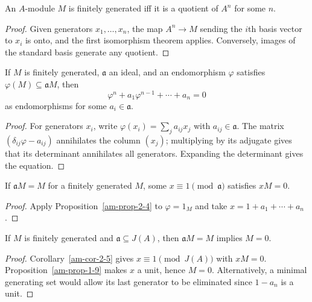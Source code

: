 \begin{proposition}
\label{am-prop-2-3}
\uses{}
An $A$-module $M$ is finitely generated iff it is a quotient of $A^n$ for some
$n$.
\end{proposition}
\begin{proof}
Given generators $x_1,\ldots,x_n$, the map $A^n\to M$ sending the $i$th basis
vector to $x_i$ is onto, and the first isomorphism theorem applies.  Conversely,
images of the standard basis generate any quotient.
\end{proof}
\begin{proposition}
\label{am-prop-2-4}
\uses{}
If $M$ is finitely generated, $\mathfrak{a}$ an ideal, and an endomorphism
$\varphi$ satisfies $\varphi(M)\subseteq\mathfrak{a}M$, then
\[\varphi^n+a_1\varphi^{n-1}+\cdots+a_n=0\]
as endomorphisms for some $a_i\in\mathfrak{a}$.
\end{proposition}
\begin{proof}
For generators $x_i$, write $\varphi(x_i)=\sum_j a_{ij}x_j$ with
$a_{ij}\in\mathfrak{a}$.  The matrix $(\delta_{ij}\varphi-a_{ij})$ annihilates
the column $(x_j)$; multiplying by its adjugate gives that its determinant
annihilates all generators.  Expanding the determinant gives the equation.
\end{proof}
\begin{corollary}
\label{am-cor-2-5}
\uses{}
If $\mathfrak{a}M=M$ for a finitely generated $M$, some $x\equiv1\pmod{\mathfrak{a}}$
satisfies $xM=0$.
\end{corollary}
\begin{proof}
Apply Proposition~\ref{am-prop-2-4} to $\varphi=1_M$ and take
$x=1+a_1+\cdots+a_n$.
\end{proof}
\begin{proposition}
\label{am-prop-2-6}
\uses{}
If $M$ is finitely generated and $\mathfrak{a}\subseteq J(A)$, then
$\mathfrak{a}M=M$ implies $M=0$.
\end{proposition}
\begin{proof}
Corollary~\ref{am-cor-2-5} gives $x\equiv1\pmod{J(A)}$ with $xM=0$.
Proposition~\ref{am-prop-1-9} makes $x$ a unit, hence $M=0$.  Alternatively,
a minimal generating set would allow its last generator to be eliminated since
$1-a_n$ is a unit.
\end{proof}
